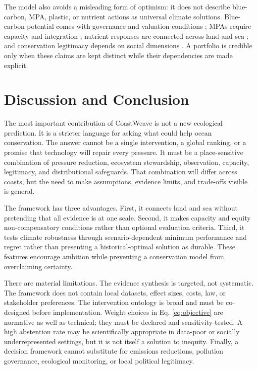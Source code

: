 \documentclass[conference]{IEEEtran}
\newcommand{\coast}{CoastWeave}
\begin{document}
The model also avoids a misleading form of optimism: it does not describe blue-carbon, MPA, plastic, or nutrient actions as universal climate solutions. Blue-carbon potential comes with governance and valuation conditions \cite{hilmi2021}; MPAs require capacity and integration \cite{mccay2011,gill2017}; nutrient responses are connected across land and sea \cite{paerl2009,malone2020}; and conservation legitimacy depends on social dimensions \cite{bennettsocial2017}. A portfolio is credible only when these claims are kept distinct while their dependencies are made explicit.

\section{Discussion and Conclusion}

The most important contribution of \coast{} is not a new ecological prediction. It is a stricter language for asking what could help ocean conservation. The answer cannot be a single intervention, a global ranking, or a promise that technology will repair every pressure. It must be a place-sensitive combination of pressure reduction, ecosystem stewardship, observation, capacity, legitimacy, and distributional safeguards. That combination will differ across coasts, but the need to make assumptions, evidence limits, and trade-offs visible is general.

The framework has three advantages. First, it connects land and sea without pretending that all evidence is at one scale. Second, it makes capacity and equity non-compensatory conditions rather than optional evaluation criteria. Third, it tests climate robustness through scenario-dependent minimum performance and regret rather than presenting a historical-optimal solution as durable. These features encourage ambition while preventing a conservation model from overclaiming certainty.

There are material limitations. The evidence synthesis is targeted, not systematic. The framework does not contain local datasets, effect sizes, costs, law, or stakeholder preferences. The intervention ontology is broad and must be co-designed before implementation. Weight choices in Eq. \eqref{eq:objective} are normative as well as technical; they must be declared and sensitivity-tested. A high abstention rate may be scientifically appropriate in data-poor or socially underrepresented settings, but it is not itself a solution to inequity. Finally, a decision framework cannot substitute for emissions reductions, pollution governance, ecological monitoring, or local political legitimacy.
\end{document}
